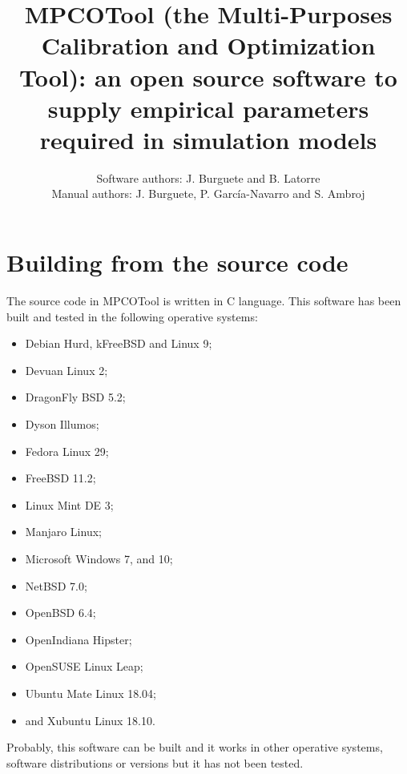 \documentclass[a4paper]{report}
\begin{document}
\title{MPCOTool (the Multi-Purposes Calibration and Optimization Tool): an open
source software to supply empirical parameters required in simulation models}

\author{Software authors: J. Burguete and B. Latorre\\
Manual authors: J. Burguete, P. García-Navarro and S. Ambroj}

\maketitle

\tableofcontents

\chapter{Building from the source code}

The source code in MPCOTool is written in C language. This software has
been built and tested in the following operative systems:
\begin{itemize}
\item Debian Hurd, kFreeBSD and Linux 9;
\item Devuan Linux 2;
\item DragonFly BSD 5.2;
\item Dyson Illumos;
\item Fedora Linux 29;
\item FreeBSD 11.2;
\item Linux Mint DE 3;
\item Manjaro Linux;
\item Microsoft Windows 7\footnotemark[1], and 10\footnotemark[1];
\item NetBSD 7.0;
\item OpenBSD 6.4;
\item OpenIndiana Hipster;
\item OpenSUSE Linux Leap;
\item Ubuntu Mate Linux 18.04;
\item and Xubuntu Linux 18.10.
\end{itemize}
Probably, this software can be built and it works in other operative systems,
software distributions or versions but it has not been tested.
\end{document}
